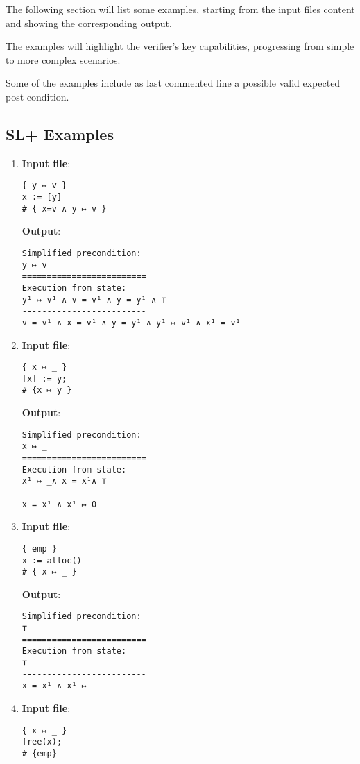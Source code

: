 \documentclass[parskip=half]{scrartcl}
\begin{document}
The following section will list some examples, starting from the input files content and showing the corresponding output.

The examples will highlight the verifier's key capabilities, progressing from simple to more complex scenarios.

Some of the examples include as last commented line a possible valid expected post condition.  

\subsection{SL+ Examples}

\begin{enumerate}

\item \textbf{Input file}: 
\begin{verbatim}
{ y ↦ v }
x := [y]
# { x=v ∧ y ↦ v }
\end{verbatim}

\textbf{Output}: 
\begin{verbatim}
Simplified precondition:
y ↦ v
=========================
Execution from state:
y¹ ↦ v¹ ∧ v = v¹ ∧ y = y¹ ∧ ⊤
-------------------------
v = v¹ ∧ x = v¹ ∧ y = y¹ ∧ y¹ ↦ v¹ ∧ x¹ = v¹
\end{verbatim}

\item 
\textbf{Input file}: 
\begin{verbatim}
{ x ↦ _ }
[x] := y; 
# {x ↦ y }
\end{verbatim}

\textbf{Output}: 
\begin{verbatim}
Simplified precondition:
x ↦ _
=========================
Execution from state:
x¹ ↦ _∧ x = x¹∧ ⊤
-------------------------
x = x¹ ∧ x¹ ↦ 0
\end{verbatim}

\item 
\textbf{Input file}: 
\begin{verbatim}
{ emp }
x := alloc()
# { x ↦ _ } 
\end{verbatim}

\textbf{Output}: 
\begin{verbatim}
Simplified precondition:
⊤
=========================
Execution from state:
⊤
-------------------------
x = x¹ ∧ x¹ ↦ _
\end{verbatim}

\item 
\textbf{Input file}: 
\begin{verbatim}
{ x ↦ _ }
free(x); 
# {emp}
\end{verbatim}


\end{enumerate}
\end{document}
